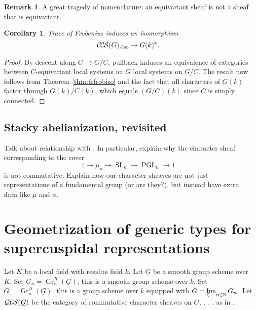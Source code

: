 \documentclass[10pt]{amsart}
\theoremstyle{plain}
\newtheorem{corollary}[theorem]{Corollary}
\theoremstyle{definition}
\newtheorem{remark}[theorem]{Remark}
\newcommand{\NN}{{\mathbb{N}}}
\newcommand{\Fq}{k}
\DeclareMathOperator{\Gr}{Gr}
\DeclareMathOperator{\SL}{SL}
\DeclareMathOperator{\PGL}{PGL}
\newcommand{\CCS}{{\mathcal{C\hskip-.8pt C\hskip-0.8pt S}}}
\newcommand{\QCS}{{\mathcal{QC\hskip-0.8pt S}}}
\newcommand{\CCSiso}[1]{\CCS(#1)_{/\text{iso}}}
\begin{document}
\begin{remark}
A great tragedy of nomenclature: an equivariant sheaf is not a sheaf that is equivariant.  
\end{remark}


 \begin{corollary}
 Trace of Frobenius induces an isomorphism
 \[
 \CCSiso{G} \to G(\Fq)^*.
 \]
 \end{corollary}
 
 \begin{proof}
 By descent along $G \to G/C$, pullback induces an equivalence of categories between $C$-equivariant local systems on $G$ local systems on  $G/C$. 
  The result now follows from Theorem \ref{thm:trfrobiso} and the fact that all characters of $G(\Fq)$ factor through
 $G(\Fq)/C(\Fq)$, which equals $(G/C)(\Fq)$ since $C$ is simply connected.
 \end{proof}
 
\subsection{Stacky abelianization, revisited}
 
 Talk about relationship with \cite{kamgarpour:09a}.  In particular, explain why the character sheaf corresponding
 to the cover
 \[
 1 \to \mu_n \to \SL_n \to \PGL_n \to 1
 \]
 is not commutative.  Explain how our character sheaves are not just representations of a fundamental group
 (or are they?), but instead have extra data like $\mu$ and $\phi$.

\section{Geometrization of generic types for supercuspidal representations}


Let $K$ be a local field with residue field $\Fq$.
Let $\underline{G}$ be a smooth group scheme over $K$.
Set $G_n = \Gr^R_n(\underline{G})$; this is a smooth group scheme over $\Fq$.
Set $G = \Gr^R_n(\underline{G})$; this is a group scheme over $\Fq$ equipped with $G = \varprojlim_{n\in \NN} G_n$.
Let $\QCS(\underline{G})$ be the category of commutative character sheaves on $G$. . . .  as in \cite{cunningham-roe:13a}.
\end{document}
